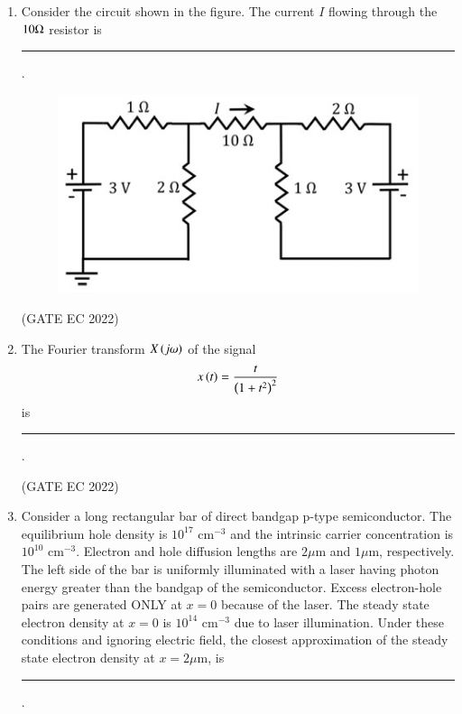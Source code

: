 \documentclass[journal,12pt,onecolumn]{IEEEtran}
\theoremstyle{remark}
\begin{document}
\begin{enumerate}
    \item Consider the circuit shown in the figure. The current $I$ flowing through the $10 \ohm$ resistor is \rule{2cm}{0.4pt}.
    \begin{figure}[H]
        \centering
        \includegraphics[width=0.5\columnwidth]{figs/m6.jpg}
        \caption*{}
        \label{fig:m6}
    \end{figure}

    \hfill{(GATE EC 2022)}
    \begin{enumerate}
    \end{enumerate}

    \item The Fourier transform $X\left(j\omega\right)$ of the signal
    \begin{align*}
        x\left(t\right) = \frac{t}{\left(1+t^2\right)^2}
    \end{align*}
    is \rule{2cm}{0.4pt}.

    \hfill{(GATE EC 2022)}
    \begin{enumerate}
    \end{enumerate}

    \item Consider a long rectangular bar of direct bandgap p-type semiconductor. The equilibrium hole density is $10^{17} \text{ cm}^{-3}$ and the intrinsic carrier concentration is $10^{10} \text{ cm}^{-3}$. Electron and hole diffusion lengths are $2 \mu\text{m}$ and $1 \mu\text{m}$, respectively.
    The left side of the bar  is uniformly illuminated with a laser having photon energy greater than the bandgap of the semiconductor. Excess electron-hole pairs are generated ONLY at $x = 0$ because of the laser. The steady state electron density at $x = 0$ is $10^{14} \text{ cm}^{-3}$ due to laser illumination. Under these conditions and ignoring electric field, the closest approximation  of the steady state electron density at $x = 2 \mu\text{m}$, is \rule{2cm}{0.4pt}.


\end{enumerate}
\end{document}
